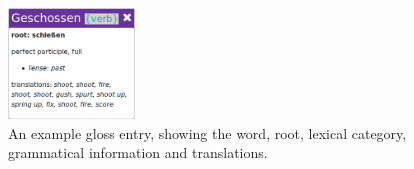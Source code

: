 \begin{figure}
	\caption[Screenshot of a Gloss Entry]{An example gloss entry, showing the word, root, lexical category, grammatical information and translations.}
	\label{fig:gloss}
	\begin{center}
	\includegraphics[width=0.3\textwidth]{Graphics/Gloss}
\end{center}
\end{figure}